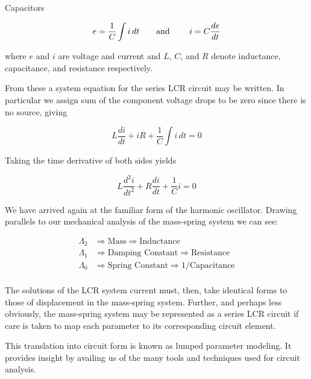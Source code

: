 \documentclass[11pt]{book}
\begin{document}
  Capacitors

  \begin{equation*}
     e = \frac{1}{C}\int i \,dt  \text{\qquad and \qquad} i = C\frac{de}{dt}
   \end{equation*}

   where $e$ and $i$ are voltage and current and $L$, $C$, and $R$
   denote inductance, capacitance, and resistance respectively.

   From these a system equation for the series LCR circuit may be
   written.  In particular we assign sum of the component voltage
   drops to be zero since there is no source, giving

   \begin{equation*}
     L \frac{di}{dt} + iR + \frac{1}{C} \int i \,dt = 0
   \end{equation*}

   Taking the time derivative of both sides yields

   \begin{equation*}
     L\frac{d^2i}{dt^2} + R\frac{di}{dt} + \frac{1}{C}i = 0
   \end{equation*}

   We have arrived again at the familiar form of the harmonic
   oscillator.  Drawing parallels to our mechanical analysis of the
   mass-spring system we can see:

   \begin{align*}
     \Lambda_2 &\Rightarrow \text{Mass} \Rightarrow \text{Inductance}\\
     \Lambda_1 &\Rightarrow \text{Damping Constant} \Rightarrow \text{Resistance}\\
     \Lambda_0 &\Rightarrow \text{Spring Constant} \Rightarrow \text{1/Capacitance}\\
   \end{align*}

   The solutions of the LCR system current must, then, take identical
   forms to those of displacement in the mass-spring system.  Further,
   and perhaps less obviously, the mass-spring system may be
   represented as a series LCR circuit if care is taken to map each parameter to
   its corresponding circuit element.

   This translation into circuit form is known as lumped parameter
   modeling.  It provides insight by availing us of the many tools and
   techniques used for circuit analysis.
   
   
  
\end{document}

